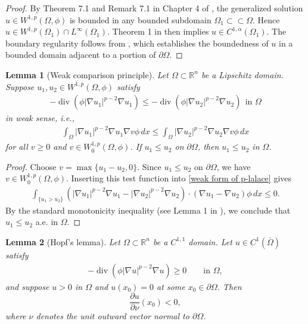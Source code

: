 \documentclass[11pt,leqno]{amsart}
\newtheorem{lemma}{Lemma}[section]
\def\p{\partial}
\def\div{\operatorname{div}}
\def \p {\partial}
\numberwithin{equation}{section}
\begin{document}
\begin{proof}
     By Theorem 7.1 and Remark 7.1 in Chapter 4 of \cite{Ladyzhenskaya},  the generalized solution  $u\in W^{1,p}(\Omega,\phi)$ is bounded in any bounded subdomain $\Omega_1\subset\subset \Omega$. Hence $u\in W^{1,p}(\Omega_1)\cap L^{\infty}(\Omega_1)$.  Theorem 1 in \cite{Tolksdorf} then implies $u\in C^{1,\alpha}(\Omega_1)$. The boundary regularity follows from  \cite{DanersTAMS}, which establishes the boundedness of  $u$ in a bounded domain adjacent to a portion of $\partial \Omega$. 
    \end{proof} 
 
\begin{lemma}[Weak comparison principle]\label{comparison lemma}
    Let $\Omega\subset \mathbb{R}^n$ be a  Lipschitz domain. Suppose $u_{1},u_{2}\in W^{1,p}(\Omega,\phi )$ satisfy 
    \begin{align*}
        -\div(\phi |\nabla u_{1}|^{p-2}\nabla u_{1})\leq -\div(\phi |\nabla u_{2}|^{p-2}\nabla u_{2}) \ \ \text{in } \Omega
    \end{align*}
    in weak sense, i.e.,
    \begin{align}\label{weak form of p-lalace}
        \int_{\Omega}|\nabla u_{1}|^{p-2}\nabla u_{1}\nabla v \phi \, dx\leq \int_{\Omega}|\nabla u_{2}|^{p-2}\nabla u_{2}\nabla v \phi \, dx
    \end{align}
    for all $v\geq 0$ and $v\in W_{0}^{1,p}(\Omega,\phi)$.
 If $u_{1}\leq u_{2}$ on $\partial \Omega$, then $u_{1}\leq u_{2}$ in $\Omega$.
\end{lemma}
\begin{proof}
    Choose $v=\max\{u_{1}-u_{2},0\}$. Since $u_{1}\leq u_{2}$ on $\partial \Omega$, we have $v\in W_{0}^{1,p}(\Omega, \phi)$. Inserting this test function into \eqref{weak form of p-lalace} gives
    \begin{align*}
        \int_{\{u_{1}>u_{2}\}}(|\nabla u_{1}|^{p-2}\nabla u_{1}-|\nabla u_{2}|^{p-2}\nabla u_{2})\cdot (\nabla u_{1}-\nabla u_{2})\phi\, dx\leq 0.
    \end{align*}
By the standard monotonicity inequality (see Lemma 1 in \cite{Tolksdorf}), we conclude that $u_{1}\leq u_{2}$ a.e. 
in $\Omega$.
\end{proof}

\begin{lemma}[Hopf's lemma]\label{Hopf's lemma}
    Let $\Omega\subset \mathbb{R}^n$ be a $C^{1,1}$ domain. Let $u\in C^{1}(\overline{\Omega})$ satisfy 
    \begin{align*}
      -\div\left( \phi |\nabla u|^{p-2} \nabla u \right) \ge 0 \qquad \text{in $\Omega$},  
    \end{align*}
    and suppose $u>0$ in $\Omega$ and $u(x_0)=0$ at some $x_0\in \p \Omega$. Then 
    $$
    \frac{\partial u}{\partial \nu}(x_{0})<0,
    $$
where $\nu$ denotes the unit outward vector normal to $\partial \Omega$.
\end{lemma}
\end{document}
